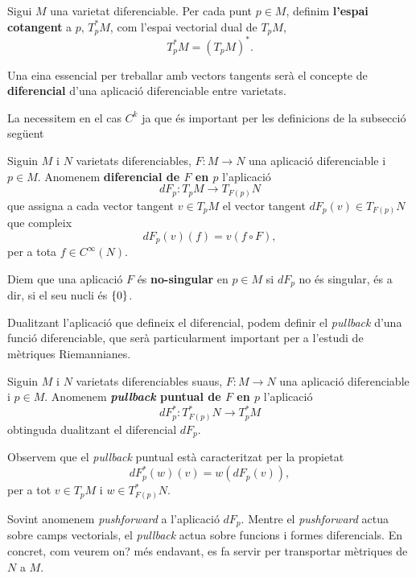 \begin{defi}
    Sigui $M$ una varietat diferenciable. Per cada punt $p\in M$, definim \textbf{l'espai cotangent} a $p$, $T^*_pM$, com l'espai vectorial dual de $T_pM$,
    \begin{equation*}
        T^*_pM = (T_pM)^*.
    \end{equation*}
\end{defi}






Una eina essencial per treballar amb vectors tangents serà el concepte de \textbf{diferencial} d'una aplicació diferenciable entre varietats.
\begin{defi}
    {\color{blue} La necessitem en el cas $C^k$ ja que és important per les definicions de la subsecció següent}
    
    Siguin $M$ i $N$ varietats diferenciables, $F:M\to N$ una aplicació diferenciable i $p\in M$. Anomenem \textbf{diferencial de $F$ en $p$} l'aplicació
    \begin{equation*}
        dF_p:T_pM\to T_{F(p)}N
    \end{equation*}
    que assigna a cada vector tangent $v\in T_pM$ el vector tangent $dF_p(v)\in T_{F(p)}N$ que compleix
    \begin{equation*}
        dF_p(v)(f) = v(f\circ F),
    \end{equation*}
    per a tota $f\in C^\infty(N)$.
\end{defi}
\begin{defi}
    Diem que una aplicació $F$ és \textbf{no-singular} en $p\in M$ si $dF_p$ no és singular, és a dir, si el seu nucli és $\{0\}$.
\end{defi}
Dualitzant l'aplicació que defineix el diferencial, podem definir el \textit{pullback} d'una funció diferenciable, que serà particularment important per a l'estudi de mètriques Riemannianes.
\begin{defi}
    Siguin $M$ i $N$ varietats diferenciables suaus, $F:M\to N$ una aplicació diferenciable i $p\in M$. Anomenem \textbf{\textit{pullback} puntual de $F$ en $p$} l'aplicació
    \begin{equation*}
        dF_p^*:T_{F(p)}^*N\to T^*_pM 
    \end{equation*}
    obtinguda dualitzant el diferencial $dF_p$.
\end{defi}
Observem que el \textit{pullback} puntual està caracteritzat per la propietat
\begin{equation*}
    dF_p^*(w)(v) = w(dF_p(v)),
\end{equation*}
per a tot $v\in T_pM$ i $w\in T^*_{F(p)}N$.
\begin{obs}
    Sovint anomenem \textit{pushforward} a l'aplicació $dF_p$. Mentre el \textit{pushforward} actua sobre camps vectorials, el \textit{pullback} actua sobre funcions i formes diferencials. En concret, com veurem {\color{blue} on? }més endavant, es fa servir per transportar mètriques de $N$ a $M$.
\end{obs}

